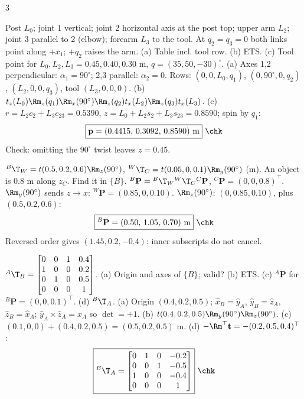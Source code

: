\begin{multicols}{3}
\begin{examq}
Post $L_0$; joint 1 vertical; joint 2 horizontal axis at the post top; upper arm $L_2$; joint 3 parallel to 2 (elbow); forearm $L_3$ to the tool. At $q_2{=}q_3{=}0$ both links point along $+x_1$; $+q_2$ raises the arm. (a) Table incl. tool row. (b) ETS. (c) Tool point for $L_0,L_2,L_3=0.45,0.40,0.30$ m, $q=(35,50,-30)^\circ$.
\solution
(a) Axes 1,2 perpendicular: $\alpha_1=90^\circ$; 2,3 parallel: $\alpha_2=0$. Rows: $(0,0,L_0,q_1)$, $(0,90^\circ,0,q_2)$, $(L_2,0,0,q_3)$, tool $(L_3,0,0,0)$.
(b) $t_z(L_0)\Rm_z(q_1)\Rm_x(90^\circ)\Rm_z(q_2)t_x(L_2)\Rm_z(q_3)t_x(L_3)$.
(c) $r=L_2c_2+L_3c_{23}=0.5390$, $z=L_0+L_2s_2+L_3s_{23}=0.8590$; spin by $q_1$:
\[\boxed{\mathbf p=(0.4415,\,0.3092,\,0.8590)\text{ m}}\ \chk\]
Check: omitting the $90^\circ$ twist leaves $z=0.45$.
\end{examq}
\begin{examq}
${}^B\T_W=t(0.5,0.2,0.6)\Rm_z(90^\circ)$, ${}^W\T_C=t(0.05,0,0.1)\Rm_y(90^\circ)$ (m). An object is 0.8 m along $z_C$. Find it in $\{B\}$.
\solution
${}^B\mathbf P={}^B\T_W{}^W\T_C{}^C\mathbf P$, ${}^C\mathbf P=(0,0,0.8)^\top$. $\Rm_y(90^\circ)$ sends $z\to x$: ${}^W\mathbf P=(0.85,0,0.10)$. $\Rm_z(90^\circ)$: $(0,0.85,0.10)$, plus $(0.5,0.2,0.6)$:
\[\boxed{{}^B\mathbf P=(0.50,\,1.05,\,0.70)\text{ m}}\ \chk\]
Reversed order gives $(1.45,0.2,-0.4)$: inner subscripts do not cancel.
\end{examq}
\begin{examq}
${}^A\T_B=\begin{bmatrix}0&0&1&0.4\\1&0&0&0.2\\0&1&0&0.5\\0&0&0&1\end{bmatrix}$. (a) Origin and axes of $\{B\}$; valid? (b) ETS. (c) ${}^A\mathbf P$ for ${}^B\mathbf P=(0,0,0.1)^\top$. (d) ${}^B\T_A$.
\solution
(a) Origin $(0.4,0.2,0.5)$; $\hat x_B=\hat y_A$, $\hat y_B=\hat z_A$, $\hat z_B=\hat x_A$; $\hat y_A\times\hat z_A=\hat x_A$ so $\det=+1$.
(b) $t(0.4,0.2,0.5)\Rm_y(90^\circ)\Rm_z(90^\circ)$.
(c) $(0.1,0,0)+(0.4,0.2,0.5)=(0.5,0.2,0.5)$ m.
(d) $-\Rm^\top\mathbf t=-(0.2,0.5,0.4)^\top$:
\[\boxed{{}^B\T_A=\begin{bmatrix}0&1&0&-0.2\\0&0&1&-0.5\\1&0&0&-0.4\\0&0&0&1\end{bmatrix}}\ \chk\]
\end{examq}
\end{multicols}
